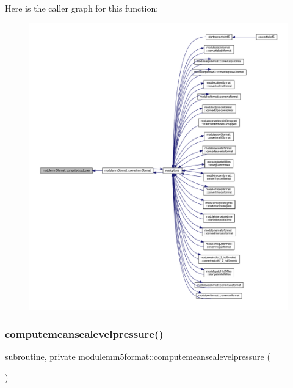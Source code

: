 Here is the caller graph for this function\+:\nopagebreak
\begin{figure}[H]
\begin{center}
\leavevmode
\includegraphics[width=350pt]{namespacemodulemm5format_af9b804a0c8c480ae7a682237c8d37831_icgraph}
\end{center}
\end{figure}
\mbox{\label{namespacemodulemm5format_a2b31840d538f04c681c86a26a2feb21f}} 
\subsubsection{\texorpdfstring{computemeansealevelpressure()}{computemeansealevelpressure()}}
{\footnotesize\ttfamily subroutine, private modulemm5format\+::computemeansealevelpressure (\begin{DoxyParamCaption}{ }\end{DoxyParamCaption})\hspace{0.3cm}{\ttfamily [private]}}

